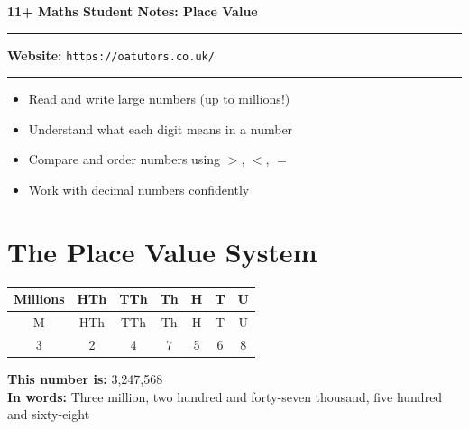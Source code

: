\documentclass[a4paper,11pt]{article}
\begin{document}
\onehalfspacing


\begin{center}
\textbf{\Large 11+ Maths Student Notes: Place Value}
\vspace{0.2cm}
\end{center}

\hrule
\vspace{0.1cm}

\textbf{Website:} \texttt{https://oatutors.co.uk/}

\vspace{0.2cm}
\hrule
\vspace{0.3cm}

\begin{tcolorbox}[colback=blue!5!white,colframe=blue!75!black,title=\textbf{What You'll Learn Today}]
\begin{itemize}
    \item Read and write large numbers (up to millions!)
    \item Understand what each digit means in a number
    \item Compare and order numbers using $>$, $<$, $=$
    \item Work with decimal numbers confidently
\end{itemize}
\end{tcolorbox}

\section{The Place Value System}

\begin{center}
\begin{tabular}{|c|c|c|c|c|c|c|}
\hline
\textbf{Millions} & \textbf{HTh} & \textbf{TTh} & \textbf{Th} & \textbf{H} & \textbf{T} & \textbf{U} \\
\hline
M & HTh & TTh & Th & H & T & U \\
\hline
3 & 2 & 4 & 7 & 5 & 6 & 8 \\
\hline
\end{tabular}
\end{center}

\textbf{This number is:} 3,247,568
\\
\textbf{In words:} Three million, two hundred and forty-seven thousand, five hundred and sixty-eight
\end{document}
